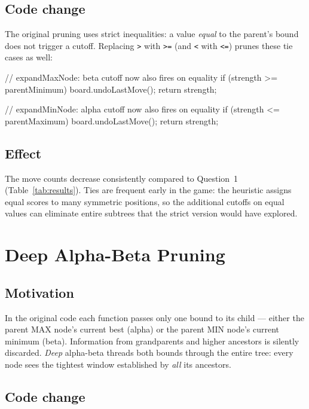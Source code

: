 \documentclass[language=english,titlepage=false,smartquotes=true]{hgbreport}
\begin{document}
\subsection{Code change}

The original pruning uses strict inequalities: a value \emph{equal} to the
parent's bound does not trigger a cutoff. Replacing \texttt{>} with
\texttt{>=} (and \texttt{<} with \texttt{<=}) prunes these tie cases as well:

\begin{JavaCode}[numbers=none]
// expandMaxNode: beta cutoff now also fires on equality
if (strength >= parentMinimum) {
    board.undoLastMove();
    return strength;
}

// expandMinNode: alpha cutoff now also fires on equality
if (strength <= parentMaximum) {
    board.undoLastMove();
    return strength;
}
\end{JavaCode}

\subsection{Effect}

The move counts decrease consistently compared to Question~1 (Table~\ref{tab:results}).
Ties are frequent early in the game: the heuristic assigns equal scores to
many symmetric positions, so the additional cutoffs on equal values can
eliminate entire subtrees that the strict version would have explored.

\section{Deep Alpha-Beta Pruning}

\subsection{Motivation}

In the original code each function passes only one bound to its child --- either
the parent MAX node's current best (alpha) or the parent MIN node's current
minimum (beta). Information from grandparents and higher ancestors is silently
discarded. \emph{Deep} alpha-beta threads both bounds through the entire tree:
every node sees the tightest window established by \emph{all} its ancestors.

\subsection{Code change}
\end{document}
